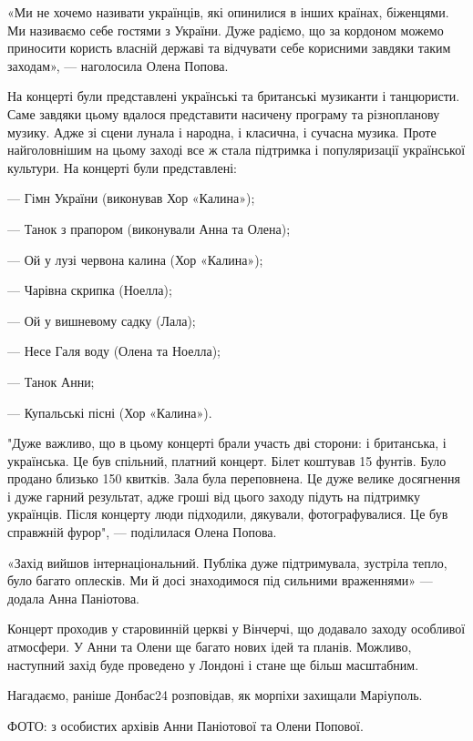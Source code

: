 «Ми не хочемо називати українців, які опинилися в інших країнах, біженцями. Ми
називаємо себе гостями з України. Дуже радіємо, що за кордоном можемо приносити
користь власній державі та відчувати себе корисними завдяки таким заходам», —
наголосила Олена Попова. 

На концерті були представлені українські та британські музиканти і танцюристи.
Саме завдяки цьому вдалося представити насичену програму та різнопланову
музику. Адже зі сцени лунала і народна, і класична, і сучасна музика. Проте
найголовнішим на цьому заході все ж стала підтримка і популяризації української
культури. На концерті були представлені:

— Гімн України (виконував Хор «Калина»);

— Танок з прапором (виконували Анна та Олена);

— Ой у лузі червона калина (Хор «Калина»);

— Чарівна скрипка (Ноелла);

— Ой у вишневому садку (Лала);

— Несе Галя воду (Олена та Ноелла);

— Танок Анни;

— Купальські пісні (Хор «Калина»).

"Дуже важливо, що в цьому концерті брали участь дві сторони: і британська, і
українська. Це був спільний, платний концерт. Білет коштував 15 фунтів. Було
продано близько 150 квитків. Зала була переповнена. Це дуже велике досягнення і
дуже гарний результат, адже гроші від цього заходу підуть на підтримку
українців. Після концерту люди підходили, дякували, фотографувалися. Це був
справжній фурор", — поділилася Олена Попова.

«Захід вийшов інтернаціональний. Публіка дуже підтримувала, зустріла тепло,
було багато оплесків. Ми й досі знаходимося під сильними враженнями» — додала
Анна Паніотова.

Концерт проходив у старовинній церкві у Вінчерчі, що додавало заходу особливої
атмосфери. У Анни та Олени ще багато нових ідей та планів. Можливо, наступний
захід буде проведено у Лондоні і стане ще більш масштабним.

Нагадаємо, раніше Донбас24 розповідав, як морпіхи захищали Маріуполь.

ФОТО: з особистих архівів Анни Паніотової та Олени Попової.
